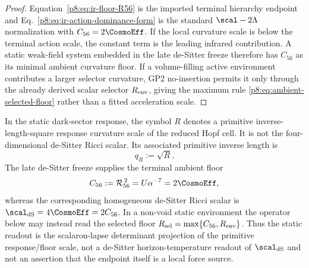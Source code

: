 \documentclass[12pt,a4paper]{article}
\begin{document}
\begin{proof}
Equation~\eqref{p8:eq:ir-floor-R56} is the imported terminal hierarchy endpoint and Eq.~\eqref{p8:eq:ir-action-dominance-form} is the standard \(\scal-2\Lambda\) normalization with \(C_{56}=2\CosmoEff\).  If the local curvature scale is below the terminal action scale, the constant term is the leading infrared contribution.  A static weak-field system embedded in the late de-Sitter freeze therefore has \(C_{56}\) as its minimal ambient curvature floor.  If a volume-filling active environment contributes a larger selector curvature, GP2 no-insertion permits it only through the already derived scalar selector \(R_{\rm env}\), giving the maximum rule \eqref{p8:eq:ambient-selected-floor} rather than a fitted acceleration scale.
\end{proof}
\begin{definition}
\label{p8:def:terminal-static-curvature}
In the static dark-sector response, the symbol \(R\) denotes a primitive inverse-length-square response curvature scale of the reduced Hopf cell.  It is not the four-dimensional de-Sitter Ricci scalar.  Its associated primitive inverse length is
\begin{equation}
\label{p8:eq:qR-static-definition}
 q_R:=\sqrt R .
\end{equation}
The late de-Sitter freeze supplies the terminal ambient floor
\begin{equation}
\label{p8:eq:R56-primitive-not-RdS}
 C_{56}:=\mathcal R_{56}^{\,2}=U\alpha^{-7}=2\CosmoEff,
\end{equation}
whereas the corresponding homogeneous de-Sitter Ricci scalar is \(\scal_{\rm dS}=4\CosmoEff=2C_{56}\).  In a non-void static environment the operator below may instead read the selected floor \(R_{\rm sel}=\max\{C_{56},R_{\rm env}\}\).  Thus the static readout is the scalaron-lapse determinant projection of the primitive response/floor scale, not a de-Sitter horizon-temperature readout of \(\scal_{\rm dS}\) and not an assertion that the endpoint itself is a local force source.
\end{definition}
\end{document}
